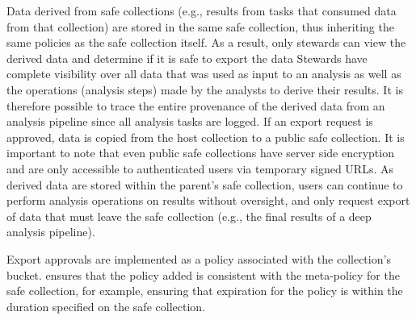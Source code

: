 Data derived from safe collections (e.g., results from tasks that consumed data from that collection)
are stored in the same safe collection, thus inheriting the same policies as the safe collection itself.
As a result, only stewards can view the derived data and determine if it is safe to 
export the data
Stewards have complete visibility over all data that was used as input to an analysis as
well as the operations (analysis steps) made by the analysts to derive their results.
It is therefore possible to trace the entire provenance of the derived data from an
analysis pipeline since all analysis tasks are logged.
If an export request is approved, data is copied from the host collection to a public safe collection. 
It is important to note that even public safe collections have server side encryption and 
are only accessible to authenticated users via temporary signed URLs. 
As derived data are stored within the parent's safe collection, users can continue 
to perform analysis operations on results without oversight,
and only request export of data that must leave the safe collection (e.g., the
final results of a deep analysis pipeline).

Export approvals are implemented as a policy associated with the collection's bucket. 
\NAME ensures that the policy added is consistent with the meta-policy for the safe collection, 
for example, ensuring that expiration for the policy
is within the duration specified on the safe collection.





